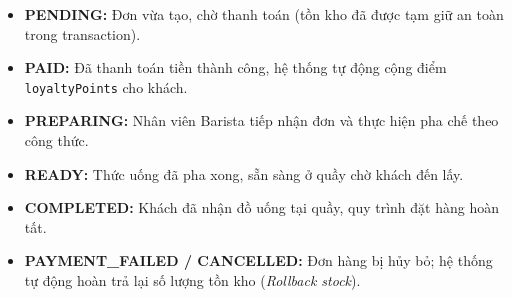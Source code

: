 \documentclass[12pt,a4paper]{article}
\begin{document}
\begin{itemize}[leftmargin=*,itemsep=1.5pt]
    \item \textbf{PENDING:} Đơn vừa tạo, chờ thanh toán (tồn kho đã được tạm giữ an toàn trong transaction).
    \item \textbf{PAID:} Đã thanh toán tiền thành công, hệ thống tự động cộng điểm \texttt{loyaltyPoints} cho khách.
    \item \textbf{PREPARING:} Nhân viên Barista tiếp nhận đơn và thực hiện pha chế theo công thức.
    \item \textbf{READY:} Thức uống đã pha xong, sẵn sàng ở quầy chờ khách đến lấy.
    \item \textbf{COMPLETED:} Khách đã nhận đồ uống tại quầy, quy trình đặt hàng hoàn tất.
    \item \textbf{PAYMENT\_FAILED / CANCELLED:} Đơn hàng bị hủy bỏ; hệ thống tự động hoàn trả lại số lượng tồn kho (\textit{Rollback stock}).
\end{itemize}
\end{document}
